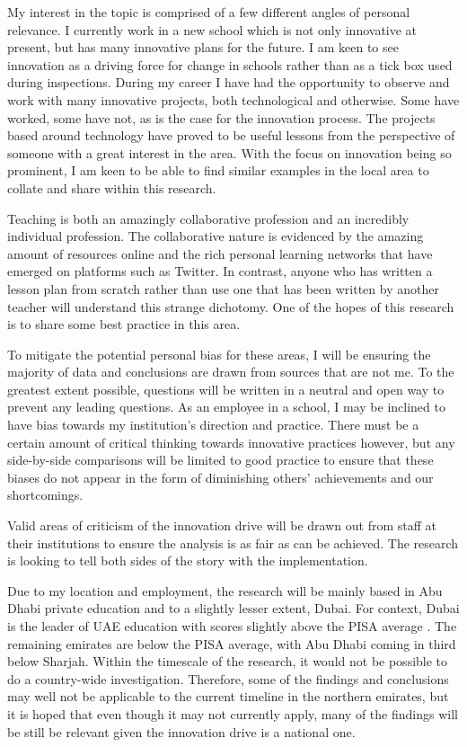 My interest in the topic is comprised of a few different angles of personal relevance. I currently work in a new school which is not only innovative at present, but has many innovative plans for the future. I am keen to see innovation as a driving force for change in schools rather than as a tick box used during inspections. During my career I have had the opportunity to observe and work with many innovative projects, both technological and otherwise. Some have worked, some have not, as is the case for the innovation process. The projects based around technology have proved to be useful lessons from the perspective of someone with a great interest in the area. With the focus on innovation being so prominent, I am keen to be able to find similar examples in the local area to collate and share within this research.

Teaching is both an amazingly collaborative profession and an incredibly individual profession. The collaborative nature is evidenced by the amazing amount of resources online and the rich personal learning networks that have emerged on platforms such as Twitter. In contrast, anyone who has written a lesson plan from scratch rather than use one that has been written by another teacher will understand this strange dichotomy. One of the hopes of this research is to share some best practice in this area.

To mitigate the potential personal bias for these areas, I will be ensuring the majority of data and conclusions are drawn from sources that are not me. To the greatest extent possible, questions will be written in a neutral and open way to prevent any leading questions.
As an employee in a school, I may be inclined to have bias towards my institution's direction and practice. There must be a certain amount of critical thinking towards innovative practices however, but any side-by-side comparisons will be limited to good practice to ensure that these biases do not appear in the form of diminishing others’ achievements and our shortcomings. 

Valid areas of criticism of the innovation drive will be drawn out from staff at their institutions to ensure the analysis is as fair as can be achieved. The research is looking to tell both sides of the story with the implementation.

Due to my location and employment, the research will be mainly based in Abu Dhabi private education and to a slightly lesser extent, Dubai. For context, Dubai is the leader of UAE education with scores slightly above the PISA average \cite{pisa2012}. The remaining emirates are below the PISA average, with Abu Dhabi coming in third below Sharjah. Within the timescale of the research, it would not be possible to do a country-wide investigation. Therefore, some of the findings and conclusions may well not be applicable to the current timeline in the northern emirates, but it is hoped that even though it may not currently apply, many of the findings will be still be relevant given the innovation drive is a national one.